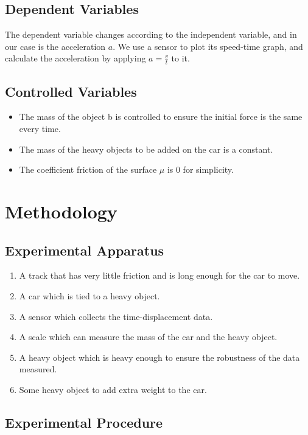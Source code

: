 \documentclass{article}
\begin{document}
\subsection{Dependent Variables}

The dependent variable changes according to the independent variable, and in our case is the acceleration $a$.
We use a sensor to plot its speed-time graph, and calculate the acceleration by applying $a = \frac{v}{t}$ to it.

\subsection{Controlled Variables}

\begin{itemize}
  \item The mass of the object b is controlled to ensure the initial force is the same every time.
  \item The mass of the heavy objects to be added on the car is a constant.
  \item The coefficient friction of the surface $\mu$ is 0 for simplicity.
\end{itemize}

\section{Methodology}

\subsection{Experimental Apparatus}

\begin{enumerate}
  \item A track that has very little friction and is long enough for the car to move.
  \item A car which is tied to a heavy object.
  \item A sensor which collects the time-displacement data.
  \item A scale which can measure the mass of the car and the heavy object.
  \item A heavy object which is heavy enough  to ensure the robustness of the data measured.
  \item Some heavy object to add extra weight to the car.
\end{enumerate}

\subsection{Experimental Procedure}
\end{document}
